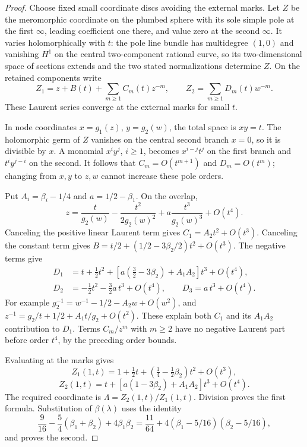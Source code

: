 \documentclass[11pt,a4paper]{article}
\theoremstyle{definition}
\begin{document}
\begin{proof}
Choose fixed small coordinate discs avoiding the external marks. Let $Z$ be the meromorphic coordinate on the plumbed sphere with its sole simple pole at the first $\infty$, leading coefficient one there, and value zero at the second $\infty$. It varies holomorphically with $t$: the pole line bundle has multidegree $(1,0)$ and vanishing $H^1$ on the central two-component rational curve, so its two-dimensional space of sections extends and the two stated normalizations determine $Z$. On the retained components write
\[
 Z_1=z+B(t)+\sum_{m\ge1}C_m(t)z^{-m},\qquad
 Z_2=\sum_{m\ge1}D_m(t)w^{-m}.
\]
These Laurent series converge at the external marks for small $t$.

In node coordinates $x=g_1(z)$, $y=g_2(w)$, the total space is $xy=t$. The holomorphic germ of $Z$ vanishes on the central second branch $x=0$, so it is divisible by $x$. A monomial $x^i y^j$, $i\ge1$, becomes $x^{i-j}t^j$ on the first branch and $t^i y^{j-i}$ on the second. It follows that $C_m=O(t^{m+1})$ and $D_m=O(t^m)$; changing from $x,y$ to $z,w$ cannot increase these pole orders.

Put $A_i=\beta_i-1/4$ and $a=1/2-\beta_1$. On the overlap,
\[
 z=\frac{t}{g_2(w)}-\frac{t^2}{2g_2(w)^2}
       +a\frac{t^3}{g_2(w)^3}+O(t^4).
\]
Canceling the positive linear Laurent term gives $C_1=A_2t^2+O(t^3)$. Canceling the constant term gives
$B=t/2+(1/2-3\beta_2/2)t^2+O(t^3)$.
The negative terms give
\begin{align*}
 D_1&=t+\tfrac12t^2+
       [a(\tfrac32-3\beta_2)+A_1A_2]t^3+O(t^4),\\
 D_2&=-\tfrac12t^2-\tfrac32a\,t^3+O(t^4),\qquad
 D_3=a\,t^3+O(t^4).
\end{align*}
For example $g_2^{-1}=w^{-1}-1/2-A_2w+O(w^2)$, and
$z^{-1}=g_2/t+1/2+A_1t/g_2+O(t^2)$.
These explain both $C_1$ and its $A_1A_2$ contribution to $D_1$. Terms $C_m/z^m$ with $m\ge2$ have no negative Laurent part before order $t^4$, by the preceding order bounds.

Evaluating at the marks gives
\[
 Z_1(1,t)=1+\tfrac12t+(\tfrac14-\tfrac12\beta_2)t^2+O(t^3),
\]
\[
 Z_2(1,t)=t+[a(1-3\beta_2)+A_1A_2]t^3+O(t^4).
\]
The required coordinate is $\Lambda=Z_2(1,t)/Z_1(1,t)$. Division proves the first formula. Substitution of $\beta(\lambda)$ uses the identity
\[
 \frac9{16}-\frac54(\beta_1+\beta_2)+4\beta_1\beta_2
 =\frac{11}{64}+4(\beta_1-5/16)(\beta_2-5/16),
\]
and proves the second.
\end{proof}
\end{document}
